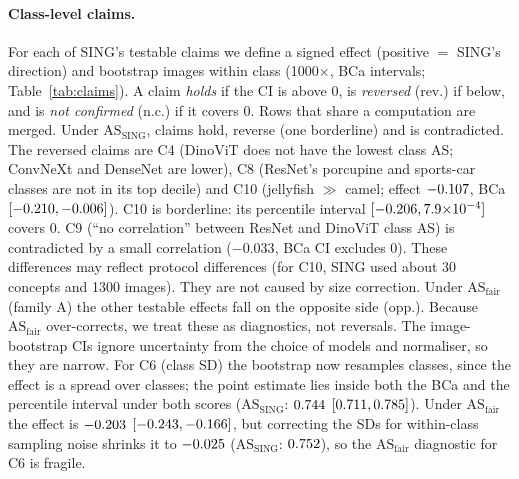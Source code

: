 \documentclass[10pt]{article}
\newcommand{\ASS}{\mathrm{AS}_{\mathrm{SING}}}
\newcommand{\ASF}{\mathrm{AS}_{\mathrm{fair}}}
\begin{document}
\paragraph{Class-level claims.}
For each of SING's testable claims we define a signed effect (positive $=$ SING's direction) and bootstrap images within class (1000$\times$, BCa intervals; Table~\ref{tab:claims}).
A claim \emph{holds} if the CI is above 0, is \emph{reversed} (rev.) if below, and is \emph{not confirmed} (n.c.) if it covers 0.
Rows that share a computation are merged.
Under $\ASS$, \NTallyHolds{} claims hold, \NTallyRev{} reverse (one borderline) and \NTallyContra{} is contradicted.
The reversed claims are C4 (DinoViT does not have the lowest class AS; ConvNeXt and DenseNet are lower), C8 (ResNet's porcupine and sports-car classes are not in its top decile) and C10 (jellyfish $\gg$ camel; effect $-0.107$, BCa $[-0.210,-0.006]$). C10 is borderline: its percentile interval $[-0.206,7.9{\times}10^{-4}]$ covers 0.
C9 (``no correlation'' between ResNet and DinoViT class AS) is contradicted by a small correlation ($-0.033$, BCa CI excludes 0).
These differences may reflect protocol differences (for C10, SING used about 30 concepts and 1300 images). They are not caused by size correction.
Under $\ASF$ (family A) the other testable effects fall on the opposite side (opp.).
Because $\ASF$ over-corrects, we treat these as diagnostics, not reversals.
The image-bootstrap CIs ignore uncertainty from the choice of models and normaliser, so they are narrow.
For C6 (class SD) the bootstrap now resamples classes, since the effect is a spread over classes; the point estimate lies inside both the BCa and the percentile interval under both scores ($\ASS$: $0.744$ $[0.711,0.785]$).
Under $\ASF$ the effect is $-0.203$ $[-0.243,-0.166]$, but correcting the SDs for within-class sampling noise shrinks it to $-0.025$ ($\ASS$: $0.752$), so the $\ASF$ diagnostic for C6 is fragile.

\begin{table}[t]
\centering\small
\resizebox{\linewidth}{!}{}
\caption{SING's class-level claims under $\ASS$ (BCa 95\% CI, images resampled within class, so the CIs are conditional on the 13 fitted translators) and family-A $\ASF$. rev.\ $=$ CI on the opposite side of 0; n.c.\ $=$ not confirmed; opp.\ $=$ opposite side under $\ASF$, a diagnostic since $\ASF$ over-corrects; contra.\ $=$ a nonzero correlation where SING reports none. C1/C11 and C3/C6 mean are one computation each. C1/C2/C11 use $|$AS$|$ proxies for SING's ratio and steerability. $^{*}$Under $\ASF$, C4 coincides numerically with C1/C11 (same model attains the minimum) and is counted once. C6 SD: classes resampled. $^{\dagger}$Borderline: the percentile interval covers 0. $^{\ddagger}$Model bootstrap; under $\ASF$, $\tau{=}{-}0.18$ $[-0.78,0.35]$, not confirmed. C7 has no $\ASF$ analogue.}
\label{tab:claims}
\end{table}
\end{document}
